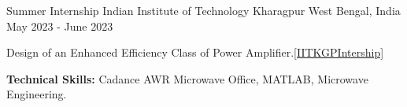 

\begin{cventries}

  \cventry
    {Summer Internship} %
    {Indian Institute of Technology Kharagpur} %
    {West Bengal, India} %
    {May 2023 - June 2023} %
    {
      \begin{cvitems} %
        \item {Design of an Enhanced Efficiency Class of Power Amplifier.\ref{IITKGPIntership}}
        \item {\textbf{Technical Skills:} Cadance AWR Microwave Office, MATLAB, Microwave Engineering.}
      \end{cvitems}
    }


\end{cventries}
